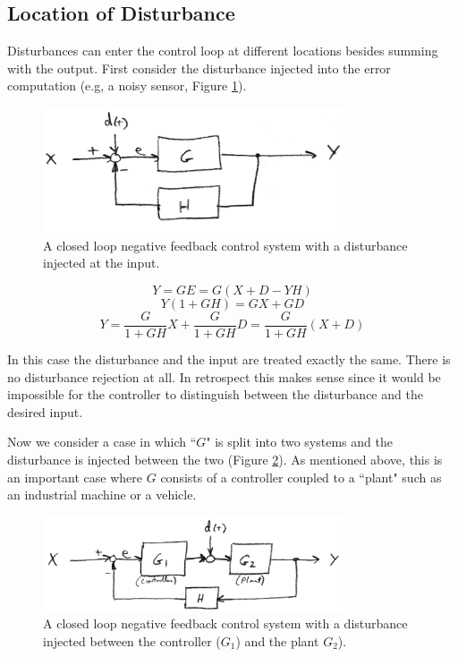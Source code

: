 \subsection{Location of Disturbance}

Disturbances can enter the control loop at different locations besides summing with the output.  First consider the disturbance injected into the error computation (e.g, a noisy sensor, Figure \ref{disturbanceaterror}).


\begin{figure}\centering
\includegraphics[width=3.5in]{figs06/00776a.png}
\caption{A closed loop negative feedback control system with a disturbance injected at the input.}\label{disturbanceaterror}
\end{figure}

\[
Y = GE = G(X+D-YH)
\]
\[
Y(1+GH) = GX + GD
\]
\[
Y = \frac{G}{1+GH}X  + \frac{G}{1+GH}D = \frac{G}{1+GH}(X+D)
\]

In this case the disturbance and the input are treated exactly the same. There is no disturbance rejection at all.  In retrospect this makes sense since it would be impossible for the controller to distinguish between the disturbance and the desired input.

Now we consider a case in which ``$G$" is split into two systems and the disturbance is injected between the two (Figure \ref{disturbancebetweenCP}).  As mentioned above,  this is an important case where $G$ consists of a controller coupled to a ``plant" such as an industrial machine or a vehicle.


\begin{figure}\centering
\includegraphics[width=3.5in]{figs06/00777a.png}
\caption{A closed loop negative feedback control system with a disturbance injected between the controller ($G_1$) and the plant $G_2$).}\label{disturbancebetweenCP}
\end{figure}


